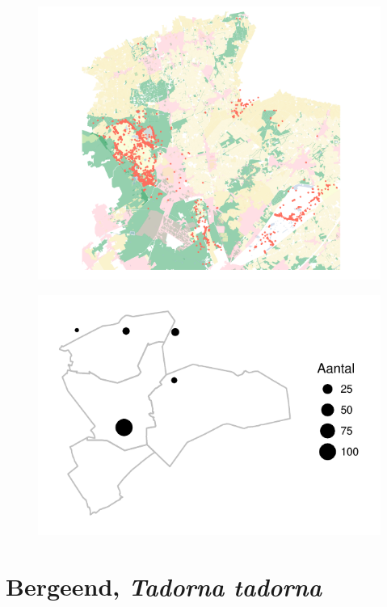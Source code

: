 \documentclass[11pt]{book}
\begin{document}
\begin{multicols}{2}
 \begin{figure}[H]
  \includegraphics{Waarnemingen/Fitis.pdf}
  \end{figure}

 \begin{figure}[H]
  \includegraphics{Atlas/Fitis.pdf}
  \end{figure}
  
\lipsum[1]

\end{multicols}

\chapter{Bergeend, \itshape Tadorna tadorna}
\end{document}
